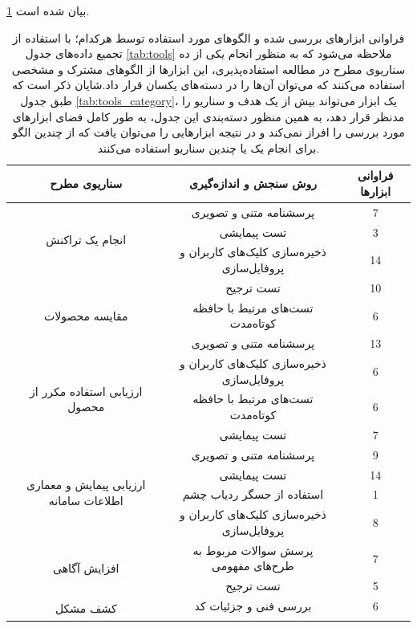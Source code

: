 \ref{tab:scenario_measurement}
بیان شده است.
\begin{table}[H]
	\caption[
	فراوانی ابزارهای بررسی شده و الگوهای مورد استفاده توسط هرکدام
	]{
		فراوانی ابزارهای بررسی شده و الگوهای مورد استفاده توسط هرکدام؛ با استفاده از تجمیع داده‌های جدول
		\ref{tab:tools}
		ملاحظه می‌شود که به منظور انجام یکی از ده سناریوی مطرح در مطالعه استفاده‌پذیری، این ابزارها از الگوهای مشترک و مشخصی استفاده می‌کنند که می‌توان آن‌ها را در دسته‌های یکسان قرار داد.شایان ذکر است که طبق جدول
		\ref{tab:tools_category}،
		یک ابزار می‌تواند بیش از یک هدف و سناریو را مدنظر قرار دهد، به همین منظور دسته‌بندی این جدول، به طور کامل فضای ابزارهای مورد بررسی را افراز نمی‌کند و در نتیجه ابزارهایی را می‌توان یافت که از چندین الگو برای انجام یک یا چندین سناریو استفاده می‌کنند.
	}
	\label{tab:scenario_measurement}
	\begin{tabular}{|c|c|c|}
		\hline
		سناریوی مطرح & روش سنجش و اندازه‌گیری & فراوانی ابزارها \\ \hline
		\multirow{3}{*}{انجام یک تراکنش} & پرسشنامه متنی و تصویری & 7 \\ \cline{2-3} 
		& تست پیمایشی & 3 \\ \cline{2-3} 
		& ذخیره‌سازی کلیک‌های کاربران و پروفایل‌سازی & 14 \\ \hline
		\multirow{3}{*}{مقایسه محصولات} & تست ترجیح & 10 \\ \cline{2-3} 
		& تست‌های مرتبط با حافظه کوتاه‌مدت & 6 \\ \cline{2-3} 
		& پرسشنامه متنی و تصویری & 13 \\ \hline
		\multirow{3}{*}{ارزیابی استفاده مکرر از محصول} & ذخیره‌سازی کلیک‌های کاربران و پروفایل‌سازی & 6 \\ \cline{2-3} 
		& تست‌های مرتبط با حافظه کوتاه‌مدت & 6 \\ \cline{2-3} 
		& تست پیمایشی & 7 \\ \hline
		\multirow{4}{*}{ارزیابی پیمایش و معماری اطلاعات سامانه} & پرسشنامه متنی و تصویری & 9 \\ \cline{2-3} 
		& تست پیمایشی & 14 \\ \cline{2-3} 
		& استفاده از حسگر ردیاب چشم & 1 \\ \cline{2-3} 
		& ذخیره‌سازی کلیک‌های کاربران و پروفایل‌سازی & 8 \\ \hline
		\multirow{2}{*}{افزایش آگاهی} & پرسش سوالات مربوط به طرح‌های مفهومی & 7 \\ \cline{2-3} 
		& تست ترجیح & 5 \\ \hline
		\multirow{5}{*}{کشف مشکل} & بررسی فنی و جزئیات کد & 6 \\ \cline{2-3} 

\end{tabular}
\end{table}
